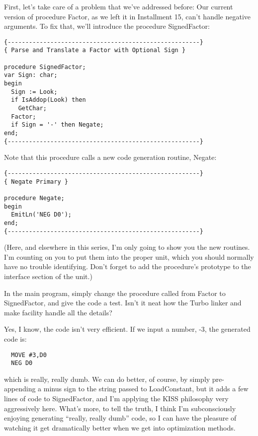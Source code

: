 First, let's take care of a problem that we've addressed before: Our current version of procedure Factor, as we left it in Installment 15, can't handle negative arguments. To fix that, we'll introduce the procedure SignedFactor:

\begin{verbatim}
{------------------------------------------------------}
{ Parse and Translate a Factor with Optional Sign }

procedure SignedFactor;
var Sign: char;
begin
  Sign := Look;
  if IsAddop(Look) then
    GetChar;
  Factor;
  if Sign = '-' then Negate;
end;
{------------------------------------------------------}
\end{verbatim}

Note that this procedure calls a new code generation routine, Negate:

\begin{verbatim}
{------------------------------------------------------}
{ Negate Primary }

procedure Negate;
begin
  EmitLn('NEG D0');
end;
{------------------------------------------------------}
\end{verbatim}

(Here, and elsewhere in this series, I'm only going to show you the new routines. I'm counting on you to put them into the proper unit, which you should normally have no trouble identifying. Don't forget to add the procedure's prototype to the interface section of the unit.)

In the main program, simply change the procedure called from Factor to SignedFactor, and give the code a test. Isn't it neat how the Turbo linker and make facility handle all the details?

Yes, I know, the code isn't very efficient. If we input a number, -3, the generated code is:

\begin{verbatim}
  MOVE #3,D0
  NEG D0
\end{verbatim}

which is really, really dumb. We can do better, of course, by simply pre-appending a minus sign to the string passed to LoadConstant, but it adds a few lines of code to SignedFactor, and I'm applying the KISS philosophy very aggressively here. What's more, to tell the truth, I think I'm subconsciously enjoying generating ``really, really dumb'' code, so I can have the pleasure of watching it get dramatically better when we get into optimization methods.

